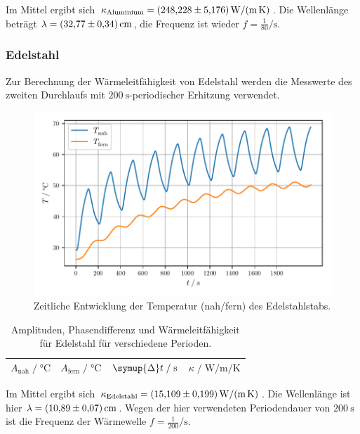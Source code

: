 Im Mittel ergibt sich $\kappa_\text{Aluminium} = \SI{248.228 \pm 5.176}{\watt\per\meter\per\kelvin}$.
Die Wellenlänge beträgt $\lambda = \SI{32.77 \pm 0.34}{\centi\meter}$,
die Frequenz ist wieder $f = \frac{1}{80} \si{\per\second}$.


\subsubsection{Edelstahl}

Zur Berechnung der Wärmeleitfähigkeit von Edelstahl werden die Messwerte des zweiten Durchlaufs mit
$\SI{200}{\second}$-periodischer Erhitzung verwendet.

\begin{figure}[H]
  \centering
  \includegraphics{build/plot_dynamisch_edelstahl.pdf}
  \caption{Zeitliche Entwicklung der Temperatur (nah/fern) des Edelstahlstabs.}
  \label{fig:dynamisch_edelstahl}
\end{figure}

\begin{table}[H]
     \centering
     \caption{Amplituden, Phasendifferenz und Wärmeleitfähigkeit für Edelstahl für verschiedene Perioden.}
     \label{tab:edelstahl}
     \begin{tabular}{c c c c}
      \toprule
      $A_\text{nah} \;/\; \si{\celsius}$ &
      $A_\text{fern} \;/\; \si{\celsius}$ &
      $\symup{\Delta}t \;/\; \si{\second}$ &
      $\kappa \;/\; \si{\watt\per\meter\per\kelvin}$ \\
      \midrule
      
      \bottomrule
     \end{tabular}
\end{table}

Im Mittel ergibt sich $\kappa_\text{Edelstahl} = \SI{15.109 \pm 0.199}{\watt\per\meter\per\kelvin}$.
Die Wellenlänge ist hier $\lambda = \SI{10.89 \pm 0.07}{\centi\meter}$.
Wegen der hier verwendeten Periodendauer von $\SI{200}{\second}$ ist die Frequenz der Wärmewelle $f = \frac{1}{200} \si{\per\second}$.

